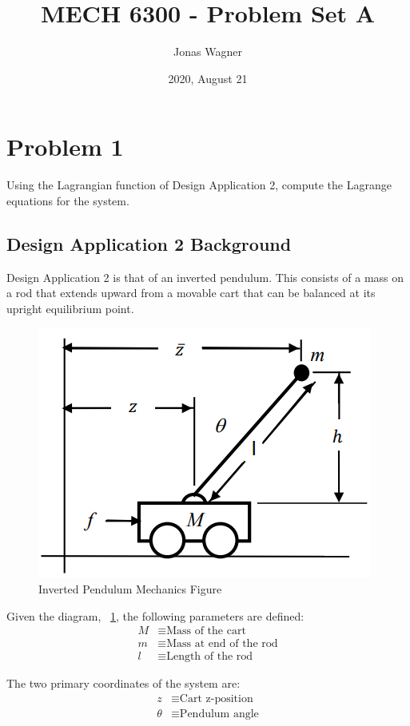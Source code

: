\documentclass[]{article}
\title{MECH 6300 - Problem Set A}
\author{Jonas Wagner}
\date{2020, August 21}
\begin{document}
\maketitle


\section{Problem 1}

	Using the Lagrangian function of Design Application 2, compute the Lagrange equations for the system.
	
	\subsection{Design Application 2 Background}
	
		Design Application 2 is that of an inverted pendulum. This consists of a mass on a rod that extends upward from a movable cart that can be balanced at its upright equilibrium point.
		
		\begin{figure}[h]
			\centering
			\includegraphics[width=0.5\linewidth]{Fig/DesignApplication2}
			\caption[]{Inverted Pendulum Mechanics Figure}
			\label{fig:designapplication2}
		\end{figure}
		
		Given the diagram, \figurename \ \ref{fig:designapplication2}, the following parameters are defined:
		\begin{align*}
			M &\equiv \text{Mass of the cart}\\
			m &\equiv \text{Mass at end of the rod}\\
			l &\equiv \text{Length of the rod}
		\end{align*}
		
		The two primary coordinates of the system are:
		\begin{align*}
			z &\equiv \text{Cart z-position}\\
			\theta &\equiv \text{Pendulum angle}
		\end{align*}
		
\end{document}
